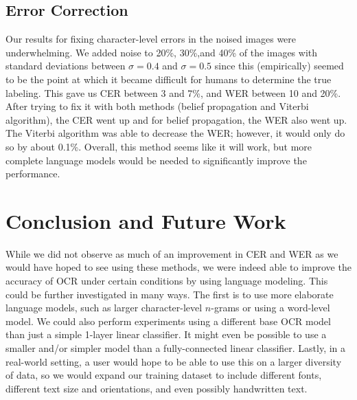 \documentclass[10pt,twocolumn,letterpaper]{article}
\begin{document}
\subsection{Error Correction}
Our results for fixing character-level errors in the noised images
were underwhelming.  We added noise to 20\%, 30\%,and 40\% of the
images with standard deviations between $\sigma = 0.4$ and $\sigma = 0.5$
since this (empirically) seemed to be the point at which it became difficult
for humans to determine the true labeling. This gave us CER between 3
and 7\%, and WER between 10 and 20\%.  After trying to fix it with both methods
(belief propagation and Viterbi algorithm), the CER went up and for belief
propagation, the WER also went up.  The Viterbi algorithm was able to
decrease the WER; however, it would only do so by about 0.1\%.
Overall, this method seems like it will work, but more complete
language models would be needed to significantly improve the performance.



\section{Conclusion and Future Work}
\label{conclusion_future_work}
While we did not observe as much of an improvement in CER and WER
as we would have hoped to see using these methods, we were indeed
able to improve the accuracy of OCR under certain conditions by
using language modeling. This could be further investigated in many
ways. The first is to use more elaborate language models, such as
larger character-level $n$-grams or using a word-level model.  We
could also perform experiments using a different base OCR model than just
a simple 1-layer linear classifier. It might even be possible to use a
smaller and/or simpler model than a fully-connected linear classifier.
Lastly, in a real-world setting, a user would hope to be able to use
this on a larger diversity of data, so we would expand our training
dataset to include different fonts, different text size and orientations,
and even possibly handwritten text.




{\small


}
\end{document}
